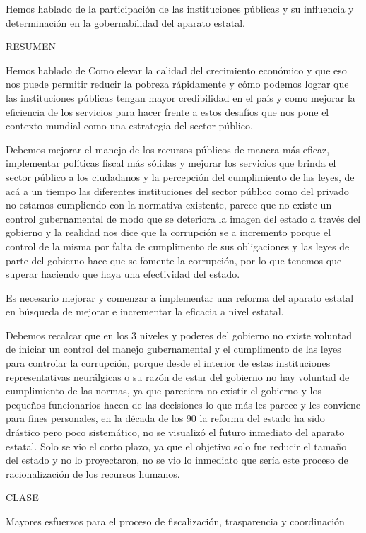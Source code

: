 \documentclass[
  letterpaper,
  DIV=11,
  numbers=noendperiod]{scrartcl}
\begin{document}
Hemos hablado de la participación de las instituciones públicas y su
influencia y determinación en la gobernabilidad del aparato estatal.

RESUMEN

Hemos hablado de Como elevar la calidad del crecimiento económico y que
eso nos puede permitir reducir la pobreza rápidamente y cómo podemos
lograr que las instituciones públicas tengan mayor credibilidad en el
país y como mejorar la eficiencia de los servicios para hacer frente a
estos desafíos que nos pone el contexto mundial como una estrategia del
sector público.

Debemos mejorar el manejo de los recursos públicos de manera más eficaz,
implementar políticas fiscal más sólidas y mejorar los servicios que
brinda el sector público a los ciudadanos y la percepción del
cumplimiento de las leyes, de acá a un tiempo las diferentes
instituciones del sector público como del privado no estamos cumpliendo
con la normativa existente, parece que no existe un control
gubernamental de modo que se deteriora la imagen del estado a través del
gobierno y la realidad nos dice que la corrupción se a incremento porque
el control de la misma por falta de cumplimento de sus obligaciones y
las leyes de parte del gobierno hace que se fomente la corrupción, por
lo que tenemos que superar haciendo que haya una efectividad del estado.

Es necesario mejorar y comenzar a implementar una reforma del aparato
estatal en búsqueda de mejorar e incrementar la eficacia a nivel
estatal.

Debemos recalcar que en los 3 niveles y poderes del gobierno no existe
voluntad de iniciar un control del manejo gubernamental y el cumplimento
de las leyes para controlar la corrupción, porque desde el interior de
estas instituciones representativas neurálgicas o su razón de estar del
gobierno no hay voluntad de cumplimiento de las normas, ya que pareciera
no existir el gobierno y los pequeños funcionarios hacen de las
decisiones lo que más les parece y les conviene para fines personales,
en la década de los 90 la reforma del estado ha sido drástico pero poco
sistemático, no se visualizó el futuro inmediato del aparato estatal.
Solo se vio el corto plazo, ya que el objetivo solo fue reducir el
tamaño del estado y no lo proyectaron, no se vio lo inmediato que sería
este proceso de racionalización de los recursos humanos.

CLASE

Mayores esfuerzos para el proceso de fiscalización, trasparencia y
coordinación
\end{document}
